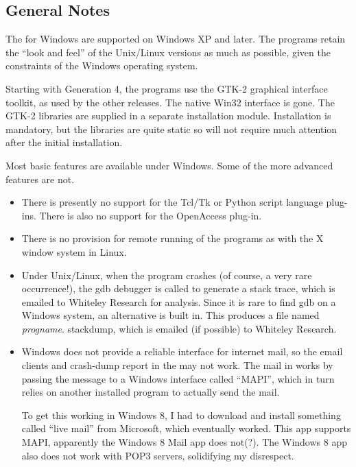 \begin{itemize}
\subsection{General Notes}

The {\XicTools} for Windows are supported on Windows XP and later. 
The programs retain the ``look and feel'' of the Unix/Linux versions
as much as possible, given the constraints of the Windows operating
system.

Starting with Generation 4, the programs use the GTK-2 graphical
interface toolkit, as used by the other releases.  The native Win32
interface is gone.  The GTK-2 libraries are supplied in a separate
installation module.  Installation is mandatory, but the libraries are
quite static so will not require much attention after the initial
installation.

Most basic features are available under Windows.  Some of the more
advanced features are not.

\begin{itemize}
\item{There is presently no support for the Tcl/Tk or Python script 
language plug-ins.
There is also no support for the OpenAccess plug-in.
}

\item{There is no provision for remote running of the programs as
with the X window system in Linux.}

\item{Under Unix/Linux, when the program crashes (of course, a very
rare occurrence!), the {\vt gdb} debugger is called to generate a
stack trace, which is emailed to Whiteley Research for analysis. 
Since it is rare to find {\vt gdb} on a Windows system, an alternative
is built in.  This produces a file named {\it progname\/}.{\vt
stackdump}, which is emailed (if possible) to Whiteley Research.}

\item{Windows does not provide a reliable interface for internet mail,
so the email clients and crash-dump report in the {\XicTools} may not
work.  The mail in {\XicTools} works by passing the message to a
Windows interface called ``MAPI'', which in turn relies on another
installed program to actually send the mail.

To get this working in Windows 8, I had to download and install
something called ``live mail'' from Microsoft, which eventually
worked.  This app supports MAPI, apparently the Windows 8 Mail app
does not(?).  The Windows 8 app also does not work with POP3 servers,
solidifying my disrespect.}
\end{itemize}


\end{itemize}
